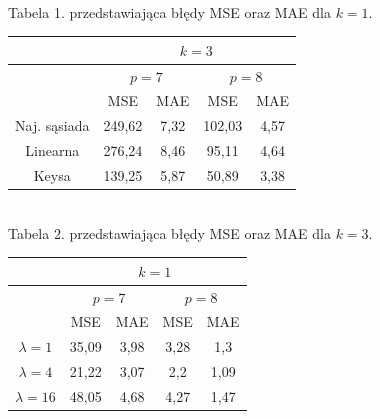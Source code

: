 \documentclass[14pt]{article}
\begin{document}
\begin{center}
\begin{tabular}{|c|c|c|c|c|}
    \end{tabular}
    \vspace{0.2cm}
    \\ \small Tabela 1. przedstawiająca błędy MSE oraz MAE dla $k=1$.



    \vspace{0.25cm}
    \begin{tabular}{|c|c|c|c|c|}
        \hline
        & \multicolumn{4}{|c|}{$k=3$} \\ \hline
        & \multicolumn{2}{|c|}{$p=7$} & \multicolumn{2}{|c|}{$p=8$} \\ \hline

        & MSE & MAE & MSE & MAE \\ \hline
        Naj. sąsiada 
        & 249,62 & 7,32 %
        & 102,03 & 4,57 \\ \hline %
        Linearna 
        & 276,24 & 8,46 %
        & 95,11 & 4,64 \\ \hline %
        Keysa 
        & 139,25 & 5,87 %
        & 50,89 & 3,38 \\ \hline %

    \end{tabular}
    \vspace{0.2cm}
    \\ \small Tabela 2. przedstawiająca błędy MSE oraz MAE dla $k=3$.



        \vspace{0.25cm}
        \begin{tabular}{|c|c|c|c|c|}
            \hline
            & \multicolumn{4}{|c|}{$k=1$} \\ \hline
            & \multicolumn{2}{|c|}{$p=7$} & \multicolumn{2}{|c|}{$p=8$} \\ \hline
    
            & MSE & MAE & MSE & MAE \\ \hline
            $\lambda = 1$ 
            & 35,09 & 3,98 %
            & 3,28 & 1,3 \\ \hline %
            $\lambda = 4$ 
            & 21,22 & 3,07 %
            & 2,2 & 1,09 \\ \hline %
            $\lambda = 16$ 
            & 48,05 & 4,68 %
            & 4,27 & 1,47 \\ \hline %
    

\end{tabular}
\end{center}
\end{document}
